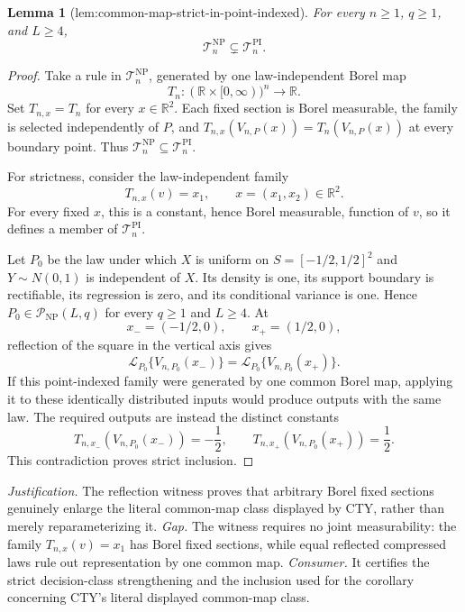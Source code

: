 \documentclass{article}
\newtheorem{lemma}{Lemma}
\begin{document}
\begin{lemma}[lem:common-map-strict-in-point-indexed]\label{lem:common-map-strict-in-point-indexed}
For every \(n\geq1\), \(q\geq1\), and \(L\geq4\),
\[
 \mathcal T_n^{\mathrm{NP}}\subsetneq\mathcal T_n^{\mathrm{PI}}.
\]
\end{lemma}
\begin{proof}
Take a rule in \(\mathcal T_n^{\mathrm{NP}}\), generated by one law-independent Borel map
\[
 T_n:(\mathbb R\times[0,\infty))^n\longrightarrow\mathbb R.
\]
Set \(T_{n,x}=T_n\) for every \(x\in\mathbb R^2\).  Each fixed section is Borel measurable, the family is selected independently of \(P\), and \(T_{n,x}(V_{n,P}(x))=T_n(V_{n,P}(x))\) at every boundary point.  Thus \(\mathcal T_n^{\mathrm{NP}}\subseteq\mathcal T_n^{\mathrm{PI}}\).

For strictness, consider the law-independent family
\[
 T_{n,x}(v)=x_1,
 \qquad x=(x_1,x_2)\in\mathbb R^2.
\]
For every fixed \(x\), this is a constant, hence Borel measurable, function of \(v\), so it defines a member of \(\mathcal T_n^{\mathrm{PI}}\).

Let \(P_0\) be the law under which \(X\) is uniform on \(S=[-1/2,1/2]^2\) and \(Y\sim N(0,1)\) is independent of \(X\).  Its density is one, its support boundary is rectifiable, its regression is zero, and its conditional variance is one.  Hence \(P_0\in\mathcal P_{\mathrm{NP}}(L,q)\) for every \(q\geq1\) and \(L\geq4\).  At
\[
 x_-=(-1/2,0),
 \qquad
 x_+=(1/2,0),
\]
reflection of the square in the vertical axis gives
\[
 \mathcal L_{P_0}\{V_{n,P_0}(x_-)\}
 =\mathcal L_{P_0}\{V_{n,P_0}(x_+)\}.
\]
If this point-indexed family were generated by one common Borel map, applying it to these identically distributed inputs would produce outputs with the same law.  The required outputs are instead the distinct constants
\[
 T_{n,x_-}(V_{n,P_0}(x_-))=-\frac12,
 \qquad
 T_{n,x_+}(V_{n,P_0}(x_+))=\frac12.
\]
This contradiction proves strict inclusion.
\end{proof}
\par\smallskip\noindent \textit{Justification.} The reflection witness proves that arbitrary Borel fixed sections genuinely enlarge the literal common-map class displayed by CTY, rather than merely reparameterizing it. \textit{Gap.} The witness requires no joint measurability: the family \(T_{n,x}(v)=x_1\) has Borel fixed sections, while equal reflected compressed laws rule out representation by one common map. \textit{Consumer.} It certifies the strict decision-class strengthening and the inclusion used for the corollary concerning CTY's literal displayed common-map class.
\end{document}
